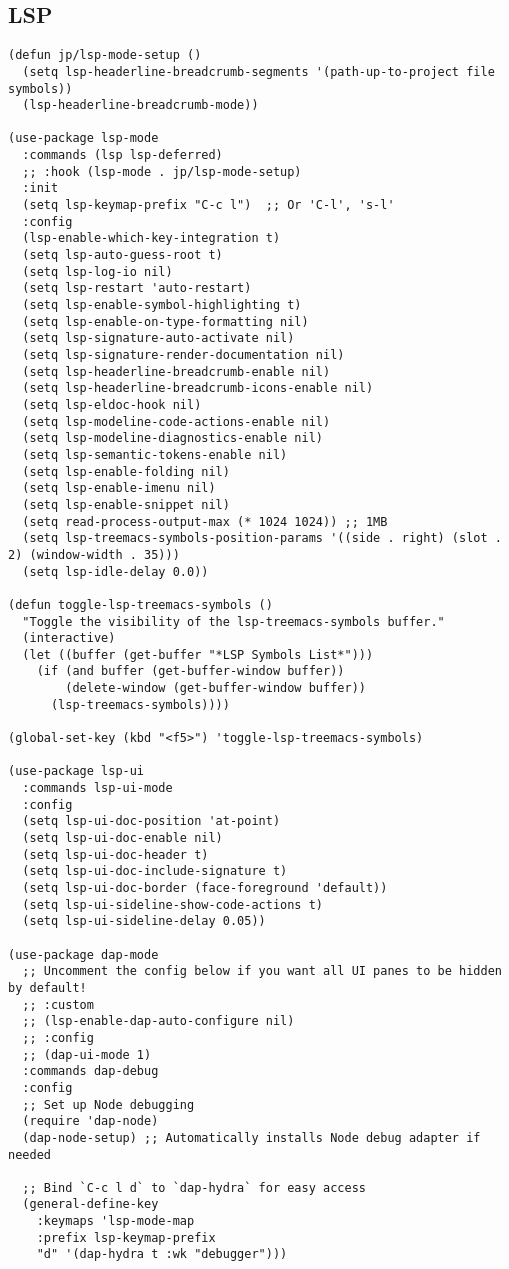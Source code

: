 \documentclass[11pt]{article}
\begin{document}
\subsection{LSP}
\label{sec:orge3bcdcf}
\begin{verbatim}
(defun jp/lsp-mode-setup ()
  (setq lsp-headerline-breadcrumb-segments '(path-up-to-project file symbols))
  (lsp-headerline-breadcrumb-mode))

(use-package lsp-mode
  :commands (lsp lsp-deferred)
  ;; :hook (lsp-mode . jp/lsp-mode-setup)
  :init
  (setq lsp-keymap-prefix "C-c l")  ;; Or 'C-l', 's-l'
  :config
  (lsp-enable-which-key-integration t)
  (setq lsp-auto-guess-root t)
  (setq lsp-log-io nil)
  (setq lsp-restart 'auto-restart)
  (setq lsp-enable-symbol-highlighting t)
  (setq lsp-enable-on-type-formatting nil)
  (setq lsp-signature-auto-activate nil)
  (setq lsp-signature-render-documentation nil)
  (setq lsp-headerline-breadcrumb-enable nil)
  (setq lsp-headerline-breadcrumb-icons-enable nil)
  (setq lsp-eldoc-hook nil)
  (setq lsp-modeline-code-actions-enable nil)
  (setq lsp-modeline-diagnostics-enable nil)
  (setq lsp-semantic-tokens-enable nil)
  (setq lsp-enable-folding nil)
  (setq lsp-enable-imenu nil)
  (setq lsp-enable-snippet nil)
  (setq read-process-output-max (* 1024 1024)) ;; 1MB
  (setq lsp-treemacs-symbols-position-params '((side . right) (slot . 2) (window-width . 35)))
  (setq lsp-idle-delay 0.0))

(defun toggle-lsp-treemacs-symbols ()
  "Toggle the visibility of the lsp-treemacs-symbols buffer."
  (interactive)
  (let ((buffer (get-buffer "*LSP Symbols List*")))
    (if (and buffer (get-buffer-window buffer))
        (delete-window (get-buffer-window buffer))
      (lsp-treemacs-symbols))))

(global-set-key (kbd "<f5>") 'toggle-lsp-treemacs-symbols)

(use-package lsp-ui
  :commands lsp-ui-mode
  :config
  (setq lsp-ui-doc-position 'at-point)
  (setq lsp-ui-doc-enable nil)
  (setq lsp-ui-doc-header t)
  (setq lsp-ui-doc-include-signature t)
  (setq lsp-ui-doc-border (face-foreground 'default))
  (setq lsp-ui-sideline-show-code-actions t)
  (setq lsp-ui-sideline-delay 0.05))

(use-package dap-mode
  ;; Uncomment the config below if you want all UI panes to be hidden by default!
  ;; :custom
  ;; (lsp-enable-dap-auto-configure nil)
  ;; :config
  ;; (dap-ui-mode 1)
  :commands dap-debug
  :config
  ;; Set up Node debugging
  (require 'dap-node)
  (dap-node-setup) ;; Automatically installs Node debug adapter if needed

  ;; Bind `C-c l d` to `dap-hydra` for easy access
  (general-define-key
    :keymaps 'lsp-mode-map
    :prefix lsp-keymap-prefix
    "d" '(dap-hydra t :wk "debugger")))
\end{verbatim}
\end{document}
